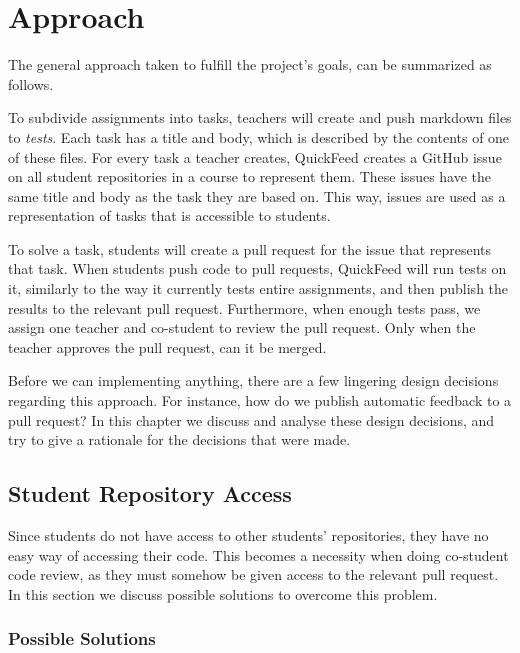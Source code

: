 
\chapter{Approach}
\label{ch:approach}

The general approach taken to fulfill the project's goals, can be summarized as follows.

To subdivide assignments into tasks, teachers will create and push markdown files to \textit{tests}.
Each task has a title and body, which is described by the contents of one of these files.
For every task a teacher creates, QuickFeed creates a GitHub issue on all student repositories in a course to represent them.
These issues have the same title and body as the task they are based on.
This way, issues are used as a representation of tasks that is accessible to students. %

To solve a task, students will create a pull request for the issue that represents that task.
When students push code to pull requests, QuickFeed will run tests on it, similarly to the way it currently tests entire assignments, and then publish the results to the relevant pull request.
Furthermore, when enough tests pass, we assign one teacher and co-student to review the pull request.
Only when the teacher approves the pull request, can it be merged.

Before we can implementing anything, there are a few lingering design decisions regarding this approach.
For instance, how do we publish automatic feedback to a pull request?
In this chapter we discuss and analyse these design decisions, and try to give a rationale for the decisions that were made.

\section{Student Repository Access}

Since students do not have access to other students' repositories, they have no easy way of accessing their code.
This becomes a necessity when doing co-student code review, as they must somehow be given access to the relevant pull request.
In this section we discuss possible solutions to overcome this problem.

\subsection{Possible Solutions}


